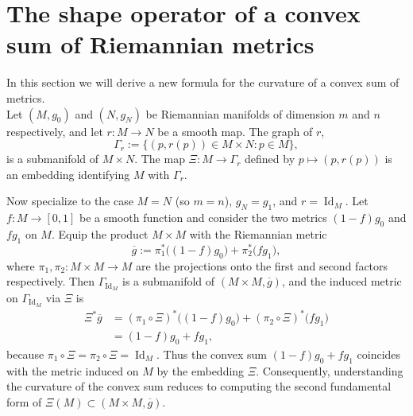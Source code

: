 \documentclass[graybox]{svmult}
\begin{document}
\section{The shape operator of a convex sum of Riemannian metrics}\label{sec:2}

In this section we will derive a new formula for the curvature of a convex sum of metrics.\\

Let $(M,g_0)$ and $(N,g_N)$ be Riemannian manifolds of dimension $m$ and $n$ respectively, and let $r : M \to N$ be a smooth map. The graph of $r$,
\[
\Gamma_r := \{(p,r(p)) \in M\times N : p \in M\},
\]
is a submanifold of $M\times N$. The map $\Xi : M \to \Gamma_r$ defined by $p \mapsto (p,r(p))$ is an embedding identifying $M$ with $\Gamma_r$.

Now specialize to the case $M = N$ (so $m = n$), $g_N = g_1$, and $r = \operatorname{Id}_M$. Let $f : M\to [0,1]$ be a smooth function and consider the two metrics $(1-f)g_0$ and $fg_1$ on $M$. Equip the product $M\times M$ with the Riemannian metric
\[
\overline{g} := \pi_1^*\big((1-f)g_0\big) + \pi_2^*\big(fg_1\big),
\]
where $\pi_1,\pi_2 : M\times M \to M$ are the projections onto the first and second factors respectively. Then $\Gamma_{\operatorname{Id}_M}$ is a submanifold of $(M\times M,\overline{g})$, and the induced metric on $\Gamma_{\operatorname{Id}_M}$ via $\Xi$ is
\begin{align*}
\Xi^*\overline{g} 
&= (\pi_1\circ\Xi)^*\big((1-f)g_0\big) + (\pi_2\circ\Xi)^*\big(fg_1\big) \\
&= (1-f)g_0 + fg_1,
\end{align*}
because $\pi_1\circ\Xi = \pi_2\circ\Xi = \operatorname{Id}_M$. Thus the convex sum $(1-f)g_0 + fg_1$ coincides with the metric induced on $M$ by the embedding $\Xi$. Consequently, understanding the curvature of the convex sum reduces to computing the second fundamental form of $\Xi(M) \subset (M\times M,\overline{g})$.
\end{document}

